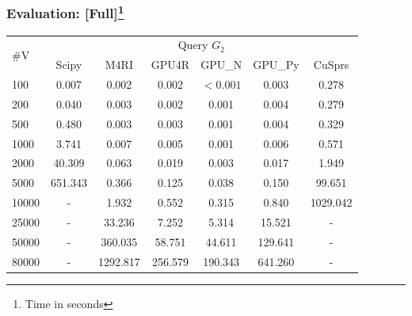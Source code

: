 \documentclass[xcolor=table]{beamer}
\begin{document}
\begin{frame}[fragile] \frametitle{Evaluation: [Full]\footnote{Time in seconds}}
\begin{center}
  {\small
  \begin{tabular}{| l | c | c | c | c | c | c |}
      \hline
      \multirow{2}{*}{\#V} & \multicolumn{6}{|c|}{Query $G_2$}  \\
      \cline{2-7}
                           & Scipy   & M4RI    & GPU4R   & GPU\_N  & GPU\_Py & CuSprs  \\
      \hline
      \hline
      100                  & 0.007   & 0.002    & 0.002   & $< 0.001$    & 0.003   & 0.278       \\
      200                  & 0.040   & 0.003    & 0.002   & 0.001   & 0.004   & 0.279       \\
      500                  & 0.480   & 0.003    & 0.003   & 0.001   & 0.004   & 0.329       \\
      1000                 & 3.741   & 0.007    & 0.005   & 0.001   & 0.006   & 0.571       \\
      2000                 & 40.309  & 0.063    & 0.019   & 0.003   & 0.017   & 1.949       \\
      5000                 & 651.343 & 0.366    & 0.125   & 0.038   & 0.150   & 99.651      \\
      10000                & -       & 1.932    & 0.552   & 0.315   & 0.840   & 1029.042    \\
      25000                & -       & 33.236   & 7.252   & 5.314   & 15.521  & -           \\
      50000                & -       & 360.035  & 58.751  & 44.611  & 129.641 & -           \\
      80000                & -       & 1292.817 & 256.579 & 190.343 & 641.260 & -           \\

      \hline
    \end{tabular}
    }
    \end{center}
\end{frame}
\end{document}
